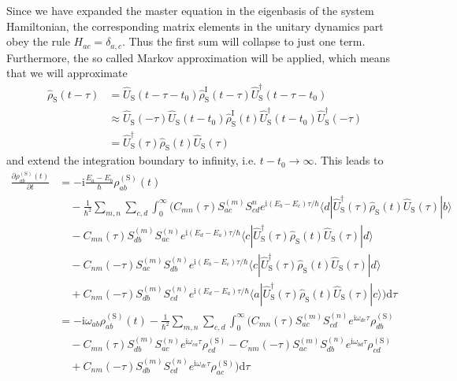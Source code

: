 \documentclass[9pt]{report}
\begin{document}
Since we have expanded the master equation in the eigenbasis of the system Hamiltonian, the corresponding matrix elements in the unitary dynamics part obey the rule $H_{ac}=\delta_{a,c}$. Thus the first sum will collapse to just one term. Furthermore, the so called Markov approximation will be applied, which means that we will approximate
\begin{align}
\hat{\rho}_{\mathrm{S}}(t-\tau) &= \hat{U}_{\mathrm{S}}(t-\tau-t_0)\hat{\rho}_{\mathrm{S}}^{\mathrm{I}}(t-\tau)\hat{U}_{\mathrm{S}}^{\dagger}(t-\tau-t_0)\\
&\approx\hat{U}_{\mathrm{S}}(-\tau)\hat{U}_{\mathrm{S}}(t-t_0)\hat{\rho}_{\mathrm{S}}^{\mathrm{I}}(t)\hat{U}_{\mathrm{S}}^{\dagger}(t-t_0)\hat{U}_{\mathrm{S}}^{\dagger}(-\tau)\\
&=\hat{U}_{\mathrm{S}}^{\dagger}(\tau)\hat{\rho}_{\mathrm{S}}(t)\hat{U}_{\mathrm{S}}(\tau)
\end{align}
and extend the integration boundary to infinity, i.e. $t-t_0\to\infty$. This leads to
\begin{align}
\frac{\partial\rho_{ab}^{(\mathrm{S})}(t)}{\partial t} &= -\mathrm{i}\frac{E_{a}-E_{b}}{\hbar}\rho_{ab}^{(\mathrm{S})}(t)\\
&\quad-\frac{1}{\hbar^2}\sum_{m,n}\sum_{c,d}\int_{0}^{\infty}\Big(C_{mn}(\tau)S_{ac}^{(m)}S_{cd}^{n}e^{\mathrm{i}(E_{b}-E_{c})\tau/\hbar}\langle d|\hat{U}_{\mathrm{S}}^{\dagger}(\tau)\hat{\rho}_{\mathrm{S}}(t)\hat{U}_{\mathrm{S}}(\tau)|b\rangle\\
&\quad-C_{mn}(\tau)S_{db}^{(m)}S_{ac}^{(n)}e^{\mathrm{i}(E_{d}-E_{a})\tau/\hbar}\langle c|\hat{U}_{\mathrm{S}}^{\dagger}(\tau)\hat{\rho}_{\mathrm{S}}(t)\hat{U}_{\mathrm{S}}(\tau)|d\rangle\\
&\quad-C_{nm}(-\tau)S_{ac}^{(m)}S_{db}^{(n)}e^{\mathrm{i}(E_{b}-E_{c})\tau/\hbar}\langle c|\hat{U}_{\mathrm{S}}^{\dagger}(\tau)\hat{\rho}_{\mathrm{S}}(t)\hat{U}_{\mathrm{S}}(\tau)|d\rangle\\
&\quad+C_{nm}(-\tau)S_{db}^{(m)}S_{cd}^{(n)}e^{\mathrm{i}(E_{d}-E_{a})\tau/\hbar}\langle a|\hat{U}_{\mathrm{S}}^{\dagger}(\tau)\hat{\rho}_{\mathrm{S}}(t)\hat{U}_{\mathrm{S}}(\tau)|c\rangle\Big)\mathrm{d}\tau\\
&=-\mathrm{i}\omega_{ab}\rho_{ab}^{(\mathrm{S})}(t)-\frac{1}{\hbar^2}\sum_{m,n}\sum_{c,d}\int_{0}^{\infty}\Big(C_{mn}(\tau)S_{ac}^{(m)}S_{cd}^{(n)}e^{\mathrm{i}\omega_{dc}\tau}\rho_{db}^{(\mathrm{S})}\\
&\quad-C_{mn}(\tau)S_{db}^{(m)}S_{ac}^{(n)}e^{\mathrm{i}\omega_{ca}\tau}\rho_{cd}^{(\mathrm{S})}-C_{nm}(-\tau)S_{ac}^{(m)}S_{db}^{(n)}e^{\mathrm{i}\omega_{bd}\tau}\rho_{cd}^{(\mathrm{S})}\\
&\quad+C_{nm}(-\tau)S_{db}^{(m)}S_{cd}^{(n)}e^{\mathrm{i}\omega_{dc}\tau}\rho_{ac}^{(\mathrm{S})}\Big)\mathrm{d}\tau
\end{align}
\end{document}
